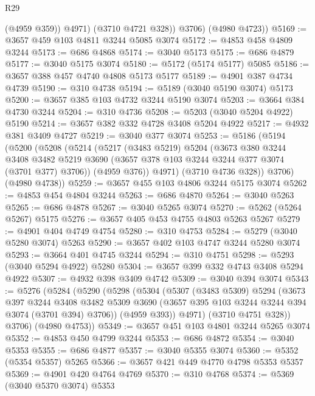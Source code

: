 \begin{lexlean}{R29}
\begin{coremodule}
              (@4959 @359))
            @4971)
          (@3710 @4721 @328))
        @3706)
      (@4980 @4723))
@5169 := @3657 @459 @103 @4811 @3244 @5085 @3074
@5172 := @4853 @458 @4809 @3244
@5173 := @686 @4868
@5174 := @3040 @5173
@5175 := @686 @4879
@5177 := @3040 @5175 @3074
@5180 := @5172 (@5174 @5177) @5085
@5186 := @3657 @388 @457 @4740 @4808 @5173 @5177
@5189 := @4901 @387 @4734 @4739
@5190 := @310 @4738
@5194 := @5189 (@3040 @5190 @3074) @5173
@5200 := @3657 @385 @103 @4732 @3244 @5190 @3074
@5203 := @3664 @384 @4730 @3244
@5204 := @310 @4736
@5208 := @5203 (@3040 @5204 @4922) @5190
@5214 := @3657 @382 @332 @4728 @3408 @5204 @4922
@5217 := @4932 @381 @3409 @4727
@5219 := @3040 @377 @3074
@5253 := @5186
    (@5194
      (@5200
        (@5208
          (@5214
            (@5217
              (@3483 @5219)
              @5204
              (@3673
                @380
                @3244
                @3408
                @3482
                @5219
                @3690
                (@3657 @378 @103 @3244 @3244 @377 @3074 (@3701 @377) @3706))
              (@4959 @376))
            @4971)
          (@3710 @4736 @328))
        @3706)
      (@4980 @4738))
@5259 := @3657 @455 @103 @4806 @3244 @5175 @3074
@5262 := @4853 @454 @4804 @3244
@5263 := @686 @4870
@5264 := @3040 @5263
@5265 := @686 @4878
@5267 := @3040 @5265 @3074
@5270 := @5262 (@5264 @5267) @5175
@5276 := @3657 @405 @453 @4755 @4803 @5263 @5267
@5279 := @4901 @404 @4749 @4754
@5280 := @310 @4753
@5284 := @5279 (@3040 @5280 @3074) @5263
@5290 := @3657 @402 @103 @4747 @3244 @5280 @3074
@5293 := @3664 @401 @4745 @3244
@5294 := @310 @4751
@5298 := @5293 (@3040 @5294 @4922) @5280
@5304 := @3657 @399 @332 @4743 @3408 @5294 @4922
@5307 := @4932 @398 @3409 @4742
@5309 := @3040 @394 @3074
@5343 := @5276
    (@5284
      (@5290
        (@5298
          (@5304
            (@5307
              (@3483 @5309)
              @5294
              (@3673
                @397
                @3244
                @3408
                @3482
                @5309
                @3690
                (@3657 @395 @103 @3244 @3244 @394 @3074 (@3701 @394) @3706))
              (@4959 @393))
            @4971)
          (@3710 @4751 @328))
        @3706)
      (@4980 @4753))
@5349 := @3657 @451 @103 @4801 @3244 @5265 @3074
@5352 := @4853 @450 @4799 @3244
@5353 := @686 @4872
@5354 := @3040 @5353
@5355 := @686 @4877
@5357 := @3040 @5355 @3074
@5360 := @5352 (@5354 @5357) @5265
@5366 := @3657 @421 @449 @4770 @4798 @5353 @5357
@5369 := @4901 @420 @4764 @4769
@5370 := @310 @4768
@5374 := @5369 (@3040 @5370 @3074) @5353

\end{coremodule}
\end{lexlean}
